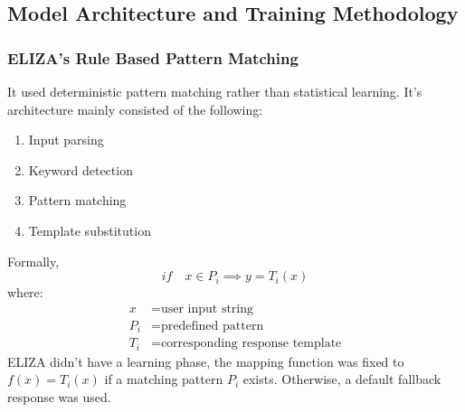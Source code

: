 \documentclass[11pt,a4paper]{report}
\begin{document}
\subsection{Model Architecture and Training Methodology}

\subsubsection{ELIZA's Rule Based Pattern Matching}
It used deterministic pattern matching rather than statistical learning. It's architecture
mainly consisted of the following:
\begin{enumerate}
  \item Input parsing
  \item Keyword detection
  \item Pattern matching
  \item Template substitution
\end{enumerate}
Formally,
\begin{equation*}
if \quad x \in P_i \implies y = T_i(x)
\end{equation*}
where:
\begin{align*}
  x &= \text{user input string}\\
  P_i &= \text{predefined pattern}\\
  T_i &= \text{corresponding response template}
\end{align*}
ELIZA didn't have a learning phase, the mapping function was fixed to $f(x) = T_i(x)$ if a 
matching pattern $P_i$ exists. Otherwise, a default fallback response was used.
\end{document}
